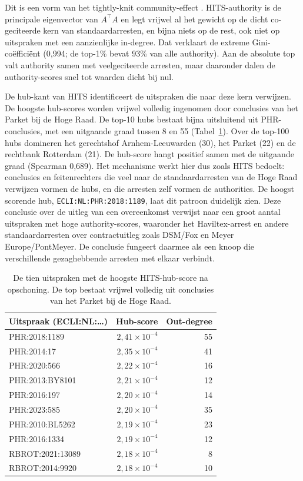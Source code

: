\documentclass[a4paper, 12pt]{report}
\begin{document}
Dit is een vorm van het tightly-knit community-effect \parencite{TKC}. HITS-authority is de principale eigenvector van $A^\top A$ en legt vrijwel al het gewicht op de dicht co-geciteerde kern van standaardarresten, en bijna niets op de rest, ook niet op uitspraken met een aanzienlijke in-degree. Dat verklaart de extreme Gini-coëfficiënt (0,994; de top-1\% bevat 93\% van alle authority). Aan de absolute top valt authority samen met veelgeciteerde arresten, maar daaronder dalen de authority-scores snel tot waarden dicht bij nul.

De hub-kant van HITS identificeert de uitspraken die naar deze kern verwijzen. De hoogste hub-scores worden vrijwel volledig ingenomen door conclusies van het Parket bij de Hoge Raad. De top-10 hubs bestaat bijna uitsluitend uit PHR-conclusies, met een uitgaande graad tussen 8 en 55 (Tabel~\ref{tab:dv2-hubs}). Over de top-100 hubs domineren het gerechtshof Arnhem-Leeuwarden (30), het Parket (22) en de rechtbank Rotterdam (21). De hub-score hangt positief samen met de uitgaande graad (Spearman 0,689). Het mechanisme werkt hier dus zoals HITS bedoelt: conclusies en feitenrechters die veel naar de standaardarresten van de Hoge Raad verwijzen vormen de hubs, en die arresten zelf vormen de authorities. De hoogst scorende hub, \texttt{ECLI:NL:PHR:2018:1189}, laat dit patroon duidelijk zien. Deze conclusie over de uitleg van een overeenkomst verwijst naar een groot aantal uitspraken met hoge authority-scores, waaronder het Haviltex-arrest en andere standaardarresten over contractuitleg zoals DSM/Fox en Meyer Europe/PontMeyer. De conclusie fungeert daarmee als een knoop die verschillende gezaghebbende arresten met elkaar verbindt.


\begin{table}[H]
  \centering
  \caption{De tien uitspraken met de hoogste HITS-hub-score na opschoning. De top bestaat vrijwel volledig uit conclusies van het Parket bij de Hoge Raad.}
  \label{tab:dv2-hubs}
  \begin{tabular}{lrr}
    \toprule
    Uitspraak (ECLI:NL:\ldots) & Hub-score & Out-degree \\
    \midrule
    PHR:2018:1189    & $2{,}41\times10^{-4}$ & 55 \\
    PHR:2014:17      & $2{,}35\times10^{-4}$ & 41 \\
    PHR:2020:566     & $2{,}22\times10^{-4}$ & 16 \\
    PHR:2013:BY8101  & $2{,}21\times10^{-4}$ & 12 \\
    PHR:2016:197     & $2{,}20\times10^{-4}$ & 14 \\
    PHR:2023:585     & $2{,}20\times10^{-4}$ & 35 \\
    PHR:2010:BL5262  & $2{,}19\times10^{-4}$ & 23 \\
    PHR:2016:1334    & $2{,}19\times10^{-4}$ & 12 \\
    RBROT:2021:13089 & $2{,}18\times10^{-4}$ & 8  \\
    RBROT:2014:9920  & $2{,}18\times10^{-4}$ & 10 \\
    \bottomrule
  \end{tabular}
\end{table}
\end{document}
